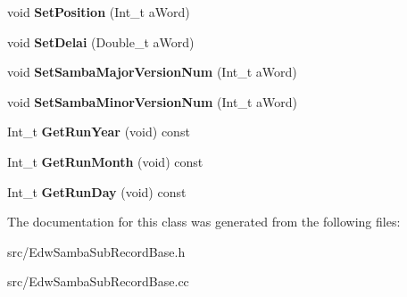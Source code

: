 \begin{DoxyCompactItemize}
\item 
\hypertarget{class_edw_samba_sub_record_base_a9a7c68b960bf405a102e7a55bbdb3e8d}{
void {\bfseries SetPosition} (Int\_\-t aWord)}
\label{class_edw_samba_sub_record_base_a9a7c68b960bf405a102e7a55bbdb3e8d}

\item 
\hypertarget{class_edw_samba_sub_record_base_a96696264fc51f945510ea4b54efa9ae2}{
void {\bfseries SetDelai} (Double\_\-t aWord)}
\label{class_edw_samba_sub_record_base_a96696264fc51f945510ea4b54efa9ae2}

\item 
\hypertarget{class_edw_samba_sub_record_base_a065bffeb660e26f08c89ba2dda91a368}{
void {\bfseries SetSambaMajorVersionNum} (Int\_\-t aWord)}
\label{class_edw_samba_sub_record_base_a065bffeb660e26f08c89ba2dda91a368}

\item 
\hypertarget{class_edw_samba_sub_record_base_aacb9f50560a4b230cd1ba3599f48f4ff}{
void {\bfseries SetSambaMinorVersionNum} (Int\_\-t aWord)}
\label{class_edw_samba_sub_record_base_aacb9f50560a4b230cd1ba3599f48f4ff}

\item 
\hypertarget{class_edw_samba_sub_record_base_a965cec71bef4f8b3aeca9b8302946939}{
Int\_\-t {\bfseries GetRunYear} (void) const }
\label{class_edw_samba_sub_record_base_a965cec71bef4f8b3aeca9b8302946939}

\item 
\hypertarget{class_edw_samba_sub_record_base_a87fb3015d9522a1a72e77ccc278b7da1}{
Int\_\-t {\bfseries GetRunMonth} (void) const }
\label{class_edw_samba_sub_record_base_a87fb3015d9522a1a72e77ccc278b7da1}

\item 
\hypertarget{class_edw_samba_sub_record_base_af1ad48474eb1e2eb750714189aa3f593}{
Int\_\-t {\bfseries GetRunDay} (void) const }
\label{class_edw_samba_sub_record_base_af1ad48474eb1e2eb750714189aa3f593}

\end{DoxyCompactItemize}


The documentation for this class was generated from the following files:\begin{DoxyCompactItemize}
\item 
src/EdwSambaSubRecordBase.h\item 
src/EdwSambaSubRecordBase.cc\end{DoxyCompactItemize}
